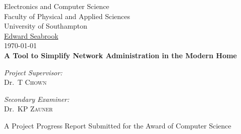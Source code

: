 
\begin{titlepage}

\begin{center}



\LARGE Electronics and Computer Science\\
Faculty of Physical and Applied Sciences\\
University of Southampton
\\[1.5cm]

\href{mailto:ejfs1g10@ecs.soton.ac.uk}{Edward Seabrook}\\[0.5cm]

\today \\[1cm]
{\bfseries A Tool to Simplify Network Administration in the Modern Home}\\[1.5cm]

\vfill

\begin{minipage}{0.4\textwidth}
\begin{flushleft} \large
\emph{Project Supervisor:} \\
Dr.~T \textsc{Chown}
\end{flushleft}
\end{minipage}
\begin{minipage}{0.4\textwidth}
\begin{flushright} \large
\emph{Secondary Examiner:}\\
Dr.~KP \textsc{Zauner} 
\end{flushright}
\end{minipage} 

\vfill

A Project Progress Report Submitted for the Award of Computer Science

\end{center}

\end{titlepage}

